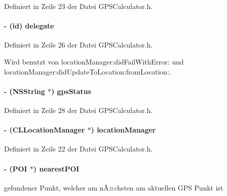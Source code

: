 Definiert in Zeile 23 der Datei GPSCalculator.h.\hypertarget{interface_g_p_s_calculator_a0afb0a146e7dc7b16a6a51dc3eb69fc3}{
\paragraph[{delegate}]{\setlength{\rightskip}{0pt plus 5cm}-\/ (id) delegate}\hfill}
\label{interface_g_p_s_calculator_a0afb0a146e7dc7b16a6a51dc3eb69fc3}


Definiert in Zeile 26 der Datei GPSCalculator.h.

Wird benutzt von locationManager:didFailWithError: und locationManager:didUpdateToLocation:fromLocation:.\hypertarget{interface_g_p_s_calculator_a437060e217fe7ab21e7738a19c2c9238}{
\paragraph[{gpsStatus}]{\setlength{\rightskip}{0pt plus 5cm}-\/ (NSString $\ast$) gpsStatus}\hfill}
\label{interface_g_p_s_calculator_a437060e217fe7ab21e7738a19c2c9238}


Definiert in Zeile 28 der Datei GPSCalculator.h.\hypertarget{interface_g_p_s_calculator_abe4f902d1cb7d075967dc769d0b15133}{
\paragraph[{locationManager}]{\setlength{\rightskip}{0pt plus 5cm}-\/ (CLLocationManager $\ast$) locationManager}\hfill}
\label{interface_g_p_s_calculator_abe4f902d1cb7d075967dc769d0b15133}


Definiert in Zeile 22 der Datei GPSCalculator.h.\hypertarget{interface_g_p_s_calculator_adb62c6bc9c85129145d61bd272ed8ec4}{
\paragraph[{nearestPOI}]{\setlength{\rightskip}{0pt plus 5cm}-\/ ({\bf POI} $\ast$) nearestPOI}\hfill}
\label{interface_g_p_s_calculator_adb62c6bc9c85129145d61bd272ed8ec4}
gefundener Punkt, welcher am nÃ¤chsten am aktuellen GPS Punkt ist 

